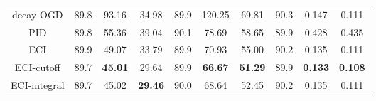 \begin{table}[ht]
\begin{center}
\begin{tabular}{c|ccc|ccc|ccc}
decay-OGD    & 89.8 & 93.16 & 34.98          & 89.9 & 120.25 & 69.81 & 90.3 & 0.147 & 0.111 \\
PID          & 89.8 & 55.36 & 39.04          & 90.1 & 78.69  & 58.65 & 89.9 & 0.428 & 0.435 \\
ECI          & 89.9 & 49.07 & 33.79          & 89.9 & 70.93  & 55.00    & 90.2 & 0.135 & 0.111 \\
ECI-cutoff & 89.7     & \textbf{45.01} & 29.64        & 89.9     & \textbf{66.67} & \textbf{51.29} & 89.9     & \textbf{0.133} & \textbf{0.108} \\
ECI-integral & 89.7 & 45.02 & \textbf{29.46} & 90.0   & 68.64  & 52.45 & 90.2 & 0.135 & 0.111 \\ \hline
\end{tabular}
\end{center}
\end{table}


